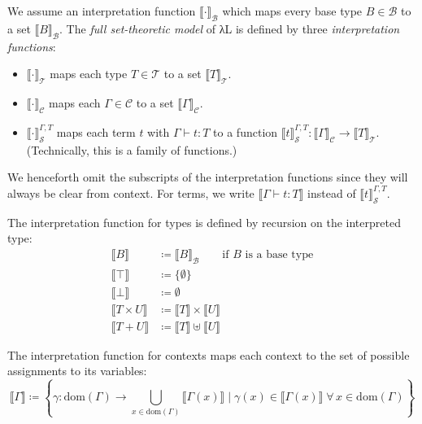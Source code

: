 \documentclass{scrartcl}
\theoremstyle{definition}
\newcommand{\Base}{\mathcal{B}}
\newcommand{\Types}{\mathcal{T}}
\newcommand{\Terms}{\mathcal{S}}
\newcommand{\Ctxs}{\mathcal{C}}
\newcommand{\dom}{\mathrm{dom}}
\begin{document}
\begin{definition}
  We assume an interpretation function $⟦·⟧_{\Base}$ which maps every base type $B ∈ \Base$ to a set $⟦B⟧_{\Base}$.
  The \emph{full set-theoretic model} of λL is defined by three \emph{interpretation functions}:
  \begin{itemize}
    \item $⟦·⟧_{\Types}$ maps each type $T ∈ \Types$ to a set $⟦T⟧_{\Types}$.
    \item $⟦·⟧_{\Ctxs}$ maps each $Γ ∈ \Ctxs$ to a set $⟦Γ⟧_{\Ctxs}$.
    \item $⟦·⟧_{\Terms}^{Γ,T}$ maps each term $t$ with $Γ ⊢ t : T$ to a function $⟦t⟧_{\Terms}^{Γ,T} : ⟦Γ⟧_{\Ctxs} → ⟦T⟧_{\Types}$.
          (Technically, this is a family of functions.)
  \end{itemize}

  We henceforth omit the subscripts of the interpretation functions since they will always be clear from context.
  For terms, we write $⟦Γ ⊢ t : T⟧$ instead of $⟦t⟧_{\Terms}^{Γ,T}$.

  The interpretation function for types is defined by recursion on the interpreted type:
  \begin{align*}
    ⟦B⟧ &≔ ⟦B⟧_{\Base} \qquad \text{if $B$ is a base type} \\
    ⟦⊤⟧ &≔ \{∅\} \\
    ⟦⊥⟧ &≔ ∅ \\
    ⟦T × U⟧ &≔ ⟦T⟧ × ⟦U⟧ \\
    ⟦T + U⟧ &≔ ⟦T⟧ ⊎ ⟦U⟧
  \end{align*}

  The interpretation function for contexts maps each context to the set of possible assignments to its variables:
  \[
    ⟦Γ⟧ ≔ \left\{ γ : \dom(Γ) → ⋃_{x ∈ \dom(Γ)} ⟦Γ(x)⟧ \;\bigg|\; γ(x) ∈ ⟦Γ(x)⟧\; ∀\, x ∈ \dom(Γ) \right\}
  \]


\end{definition}
\end{document}
